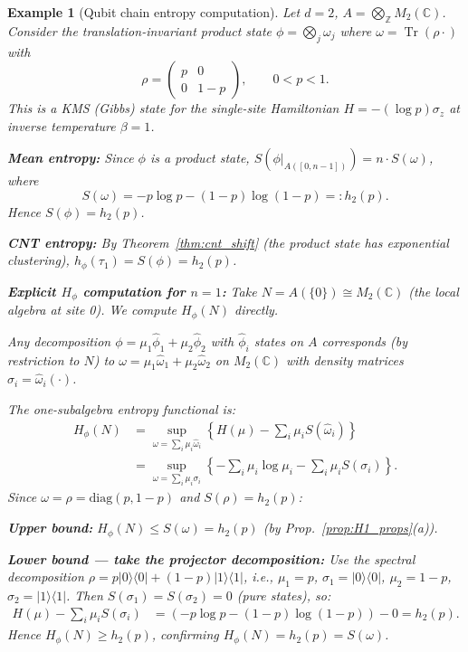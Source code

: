 \documentclass[12pt,a4paper]{article}
\newtheorem{example}[theorem]{Example}
\newcommand{\CC}{\mathbb{C}}
\newcommand{\ZZ}{\mathbb{Z}}
\newcommand{\Tr}{\operatorname{Tr}}
\newcommand{\Hphi}{H_{\phi}}
\begin{document}
\begin{example}[Qubit chain entropy computation]\label{ex:qubit}
Let $d=2$, $A=\bigotimes_\ZZ M_2(\CC)$.
Consider the translation-invariant \emph{product state}
$\phi=\bigotimes_j\omega_j$ where $\omega=\Tr(\rho\cdot)$ with
\begin{equation}\label{eq:qubit_state}
  \rho = \begin{pmatrix} p & 0 \\ 0 & 1-p \end{pmatrix}, \qquad 0<p<1.
\end{equation}
This is a KMS (Gibbs) state for the single-site Hamiltonian $H=-(\log p)\sigma_z$
at inverse temperature $\beta=1$.

\textbf{Mean entropy:}
Since $\phi$ is a product state, $S(\phi|_{A([0,n-1])})=n\cdot S(\omega)$,
where
\begin{equation}\label{eq:qubit_entropy}
  S(\omega) = -p\log p - (1-p)\log(1-p) =: h_2(p).
\end{equation}
Hence $S(\phi)=h_2(p)$.

\textbf{CNT entropy:}
By Theorem~\ref{thm:cnt_shift} (the product state has exponential clustering),
$h_\phi(\tau_1)=S(\phi)=h_2(p)$.

\textbf{Explicit $H_\phi$ computation for $n=1$:}
Take $N=A(\{0\})\cong M_2(\CC)$ (the local algebra at site 0).
We compute $\Hphi(N)$ directly.

Any decomposition $\phi=\mu_1\hat\phi_1+\mu_2\hat\phi_2$ with $\hat\phi_i$ states
on $A$ corresponds (by restriction to $N$) to $\omega=\mu_1\hat\omega_1+\mu_2\hat\omega_2$
on $M_2(\CC)$ with density matrices $\sigma_i=\hat\omega_i(\cdot)$.

The one-subalgebra entropy functional is:
\begin{align}
  \Hphi(N)
  &= \sup_{\omega=\sum_i\mu_i\hat\omega_i}
     \left\{H(\mu) - \sum_i\mu_i S(\hat\omega_i)\right\}\nonumber\\
  &= \sup_{\omega=\sum_i\mu_i\sigma_i}
     \left\{-\sum_i\mu_i\log\mu_i - \sum_i\mu_i S(\sigma_i)\right\}.\label{eq:qubit_Hphi}
\end{align}
Since $\omega=\rho=\mathrm{diag}(p,1-p)$ and $S(\rho)=h_2(p)$:

\medskip\noindent\textbf{Upper bound:} $\Hphi(N)\le S(\omega)=h_2(p)$ (by Prop.~\ref{prop:H1_props}(a)).

\medskip\noindent\textbf{Lower bound — take the projector decomposition:}
Use the spectral decomposition $\rho=p|0\rangle\langle 0|+(1-p)|1\rangle\langle 1|$,
i.e., $\mu_1=p$, $\sigma_1=|0\rangle\langle 0|$, $\mu_2=1-p$, $\sigma_2=|1\rangle\langle 1|$.
Then $S(\sigma_1)=S(\sigma_2)=0$ (pure states), so:
\begin{align}
  H(\mu)-\sum_i\mu_i S(\sigma_i)
  &= (-p\log p-(1-p)\log(1-p)) - 0 = h_2(p).
\end{align}
Hence $\Hphi(N)\ge h_2(p)$, confirming $\Hphi(N)=h_2(p)=S(\omega)$.


\end{example}
\end{document}
